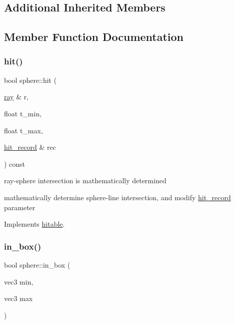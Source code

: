 \subsection*{Additional Inherited Members}


\subsection{Member Function Documentation}
\mbox{\label{classsphere_a35269706d92c22a6560d038ad2cb0192}} 
\subsubsection{\texorpdfstring{hit()}{hit()}}
{\footnotesize\ttfamily bool sphere\+::hit (\begin{DoxyParamCaption}\item[{\hyperlink{classray}{ray} \&}]{r,  }\item[{float}]{t\+\_\+min,  }\item[{float}]{t\+\_\+max,  }\item[{\hyperlink{structhit__record}{hit\+\_\+record} \&}]{rec }\end{DoxyParamCaption}) const\hspace{0.3cm}{\ttfamily [virtual]}}



ray-\/sphere intersection is mathematically determined 

mathematically determine sphere-\/line intersection, and modify \hyperlink{structhit__record}{hit\+\_\+record} parameter 

Implements \hyperlink{classhitable}{hitable}.

\mbox{\label{classsphere_a92ec275047fef95f50265a418b55ac66}} 
\subsubsection{\texorpdfstring{in\+\_\+box()}{in\_box()}}
{\footnotesize\ttfamily bool sphere\+::in\+\_\+box (\begin{DoxyParamCaption}\item[{vec3}]{min,  }\item[{vec3}]{max }\end{DoxyParamCaption})\hspace{0.3cm}{\ttfamily [virtual]}}



